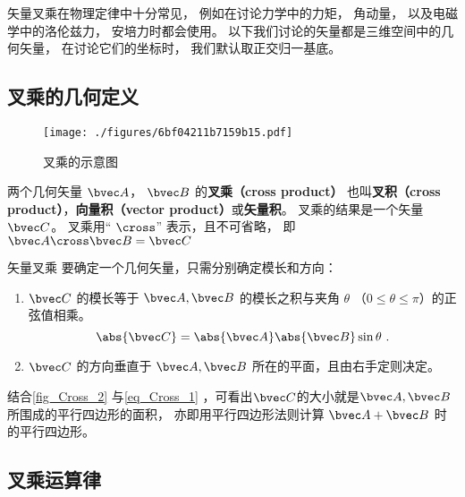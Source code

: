 

矢量叉乘在物理定律中十分常见， 例如在讨论力学中的力矩， 角动量， 以及电磁学中的洛伦兹力， 安培力时都会使用。 以下我们讨论的矢量都是三维空间中的几何矢量， 在讨论它们的坐标时， 我们默认取正交归一基底。

\subsection{叉乘的几何定义}

\begin{figure}[ht]
\centering
\texttt{[image: ./figures/6bf04211b7159b15.pdf]}
\caption{叉乘的示意图} \label{fig_Cross_2}
\end{figure}

两个几何矢量 $\bvec A$，  $\bvec B$ 的\textbf{叉乘（cross product）} 也叫\textbf{叉积（cross product）}，\textbf{向量积（vector product）}或\textbf{矢量积}。 叉乘的结果是一个矢量 $\bvec C$。  叉乘用“ $\cross$” 表示，且不可省略， 即 $ \bvec A \cross \bvec B = \bvec C$

\begin{definition}{矢量叉乘}\label{def_Cross_1}
要确定一个几何矢量，只需分别确定模长和方向：
\begin{enumerate}
\item $\bvec C$ 的模长等于 $\bvec A, \bvec B$ 的模长之积与夹角 $\theta$ （$0 \leqslant \theta \leqslant \pi$）的正弦值相乘。
\begin{equation}\label{eq_Cross_1}
\abs{\bvec C}  = \abs{\bvec A} \abs{\bvec B} \sin\theta ~.
\end{equation}
\item $\bvec C$ 的方向垂直于 $\bvec A, \bvec B$ 所在的平面，且由右手定则决定。
\end{enumerate}
\end{definition}

结合\autoref{fig_Cross_2} 与\autoref{eq_Cross_1} ，可看出$\bvec C$的大小就是$\bvec A, \bvec B$所围成的平行四边形的面积， 亦即用平行四边形法则计算 $\bvec A + \bvec B$ 时的平行四边形。

\subsection{叉乘运算律}
